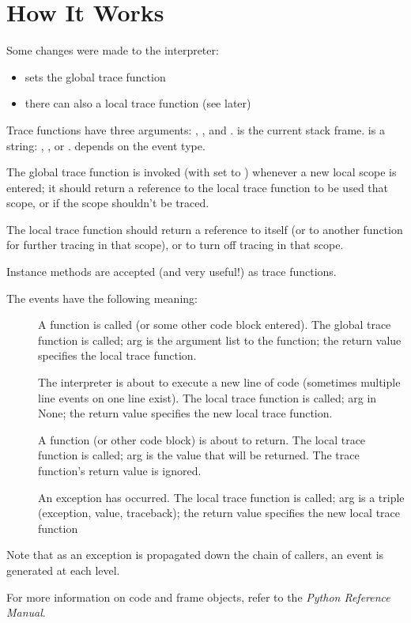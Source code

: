 \section{How It Works}

Some changes were made to the interpreter:

\begin{itemize}
\item {} sets the global trace function
\item there can also a local trace function (see later)
\end{itemize}

Trace functions have three arguments: , , and
.  is the current stack frame.   is a
string: , ,  or
.   depends on the event type.

The global trace function is invoked (with  set to
) whenever a new local scope is entered; it should return
a reference to the local trace function to be used that scope, or
 if the scope shouldn't be traced.

The local trace function should return a reference to itself (or to
another function for further tracing in that scope), or  to
turn off tracing in that scope.

Instance methods are accepted (and very useful!) as trace functions.

The events have the following meaning:

\begin{description}

\item[]
A function is called (or some other code block entered).  The global
trace function is called; arg is the argument list to the function;
the return value specifies the local trace function.

\item[]
The interpreter is about to execute a new line of code (sometimes
multiple line events on one line exist).  The local trace function is
called; arg in None; the return value specifies the new local trace
function.

\item[]
A function (or other code block) is about to return.  The local trace
function is called; arg is the value that will be returned.  The trace
function's return value is ignored.

\item[]
An exception has occurred.  The local trace function is called; arg is
a triple (exception, value, traceback); the return value specifies the
new local trace function

\end{description}

Note that as an exception is propagated down the chain of callers, an
 event is generated at each level.

For more information on code and frame objects, refer to the
\emph{Python Reference Manual}.
